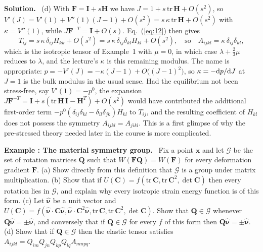 \documentclass[a4paper,12pt]{paper}
\newcounter{example}
\renewenvironment{example}[1]{%
  \refstepcounter{example}%
  \begin{mdframed}[linewidth=1pt,innertopmargin=6pt,innerbottommargin=6pt]%
  \noindent\textbf{Example \theexample: #1.}\ }{%
  \end{mdframed}}
\newenvironment{solution}{\par\noindent\textbf{Solution.}\ }{\par\medskip}
\begin{document}
\begin{solution}
(d) With $\mathbf{F}=\mathbf{I}+s\mathbf{H}$ we have $J=1+s\,\mathrm{tr}\,\mathbf{H}+O(s^{2})$, so
$V'(J)=V'(1)+V''(1)(J-1)+O(s^{2})=s\,\kappa\,\mathrm{tr}\,\mathbf{H}+O(s^{2})$ with $\kappa=V''(1)$,
while $J\mathbf{F}^{-T}=\mathbf{I}+O(s)$. Eq.~(\ref{eq:12}) then gives
\begin{equation}
T_{ij}=s\,\kappa\,\delta_{ij}H_{kk}+O(s^{2})=s\,\kappa\,\delta_{ij}\delta_{kl}H_{kl}+O(s^{2}),
\quad\text{so}\quad A_{ijkl}=\kappa\,\delta_{ij}\delta_{kl},
\label{eq:17}
\end{equation}
which is the isotropic tensor of Example~1 with $\mu=0$, in which case
$\lambda+\frac{2}{3}\mu$ reduces to $\lambda$, and the lecture's $\kappa$ is this remaining modulus.
The name is appropriate: $p=-V'(J)=-\kappa(J-1)+O\big((J-1)^{2}\big)$, so $\kappa=-\mathrm{d} p/\mathrm{d} J$
at $J=1$ is the bulk modulus in the usual sense. Had the equilibrium not been stress-free, say
$V'(1)=-p^{0}$, the expansion $J\mathbf{F}^{-T}=\mathbf{I}+s(\mathrm{tr}\,\mathbf{H}\,\mathbf{I}-\mathbf{H}^{T})+O(s^{2})$
would have contributed the additional first-order term
$-p^{0}(\delta_{ij}\delta_{kl}-\delta_{il}\delta_{jk})H_{kl}$ to $T_{ij}$, and the resulting
coefficient of $H_{kl}$ does not possess the symmetry $A_{ijkl}=A_{jikl}$. This is a first glimpse of
why the pre-stressed theory needed later in the course is more complicated.
\end{solution}

\begin{example}{The material symmetry group}
Fix a point $\mathbf{x}$ and let $\mathcal{G}$ be the set of rotation matrices $\mathbf{Q}$ such
that $W(\mathbf{F}\mathbf{Q})=W(\mathbf{F})$ for every deformation gradient $\mathbf{F}$.
(a) Show directly from this definition that $\mathcal{G}$ is a group under matrix multiplication.
(b) Show that if $U(\mathbf{C})=f(\mathrm{tr}\,\mathbf{C},\mathrm{tr}\,\mathbf{C}^{2},\det\mathbf{C})$
then every rotation lies in $\mathcal{G}$, and explain why every isotropic strain energy function
is of this form. (c) Let $\hat{\bm{\nu}}$ be a unit vector and
$U(\mathbf{C})=f(\hat{\bm{\nu}}\cdot\mathbf{C}\hat{\bm{\nu}},\hat{\bm{\nu}}\cdot\mathbf{C}^{2}\hat{\bm{\nu}},
\mathrm{tr}\,\mathbf{C},\mathrm{tr}\,\mathbf{C}^{2},\det\mathbf{C})$. Show that
$\mathbf{Q}\in\mathcal{G}$ whenever $\mathbf{Q}\hat{\bm{\nu}}=\pm\hat{\bm{\nu}}$, and conversely
that if $\mathbf{Q}\in\mathcal{G}$ for every $f$ of this form then $\mathbf{Q}\hat{\bm{\nu}}=\pm\hat{\bm{\nu}}$.
(d) Show that if $\mathbf{Q}\in\mathcal{G}$ then the elastic tensor satisfies
$A_{ijkl}=Q_{im}Q_{jn}Q_{kp}Q_{lq}A_{mnpq}$.
\end{example}
\end{document}
